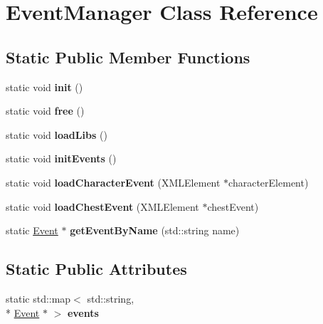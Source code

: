 \hypertarget{classEventManager}{\section{Event\-Manager Class Reference}
\label{classEventManager}
}
\subsection*{Static Public Member Functions}
\begin{DoxyCompactItemize}
\item 
\hypertarget{classEventManager_a62454914f03a84b37f98dd224f2fc435}{static void {\bfseries init} ()}\label{classEventManager_a62454914f03a84b37f98dd224f2fc435}

\item 
\hypertarget{classEventManager_aec7d51c3cc8a14d3975815b959c36df7}{static void {\bfseries free} ()}\label{classEventManager_aec7d51c3cc8a14d3975815b959c36df7}

\item 
\hypertarget{classEventManager_a217e8e0bf1bfb7a5aebe03fa3474e4bf}{static void {\bfseries load\-Libs} ()}\label{classEventManager_a217e8e0bf1bfb7a5aebe03fa3474e4bf}

\item 
\hypertarget{classEventManager_a6def79410e129d3250f938a73dbb76a7}{static void {\bfseries init\-Events} ()}\label{classEventManager_a6def79410e129d3250f938a73dbb76a7}

\item 
\hypertarget{classEventManager_a700c02b50d7715bddc1c42ef46e17839}{static void {\bfseries load\-Character\-Event} (X\-M\-L\-Element $\ast$character\-Element)}\label{classEventManager_a700c02b50d7715bddc1c42ef46e17839}

\item 
\hypertarget{classEventManager_a07bc872ae0f9031938177b0963304fa3}{static void {\bfseries load\-Chest\-Event} (X\-M\-L\-Element $\ast$chest\-Event)}\label{classEventManager_a07bc872ae0f9031938177b0963304fa3}

\item 
\hypertarget{classEventManager_a3881415063eeb5616fad43cbaf9c3ade}{static \hyperlink{classEvent}{Event} $\ast$ {\bfseries get\-Event\-By\-Name} (std\-::string name)}\label{classEventManager_a3881415063eeb5616fad43cbaf9c3ade}

\end{DoxyCompactItemize}
\subsection*{Static Public Attributes}
\begin{DoxyCompactItemize}
\item 
\hypertarget{classEventManager_a284838a41921af7df612b8198b89f0ba}{static std\-::map$<$ std\-::string, \\*
\hyperlink{classEvent}{Event} $\ast$ $>$ {\bfseries events}}\label{classEventManager_a284838a41921af7df612b8198b89f0ba}

\end{DoxyCompactItemize}


